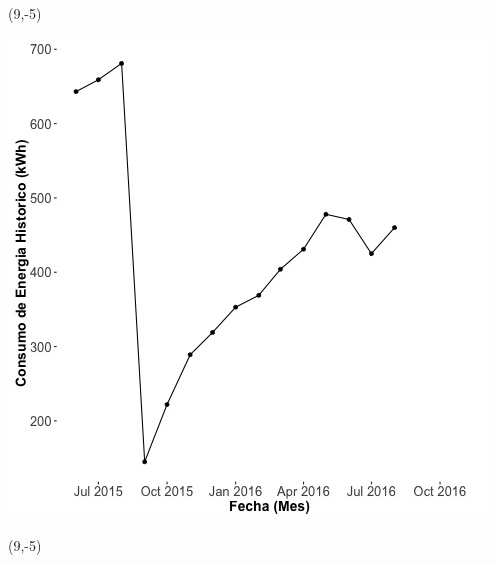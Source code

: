 \documentclass{article}\usepackage[]{graphicx}\usepackage[]{color}
\newenvironment{knitrout}{}{} %
\begin{document}
 \begin{textblock}{1}(9,-5)
\begin{minipage}{20em}
\begingroup

\endgroup
\end{minipage}
\end{textblock}

\begin{knitrout}
\color{fgcolor}
\includegraphics[scale=0.65]{figure/A29_historico_energia} 
\end{knitrout}

 \begin{textblock}{1}(9,-5)
\begin{minipage}{20em}
\begingroup

\endgroup
\end{minipage}
\end{textblock}
\end{document}
